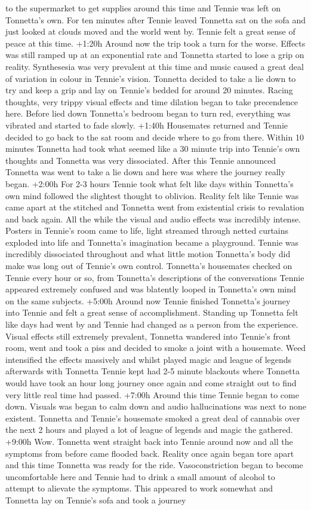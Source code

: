 \documentclass[12pt]{book}
\begin{document}
to the supermarket to get supplies around this time and Tennie was left on Tonnetta's own. For ten minutes after Tennie leaved Tonnetta sat on the sofa and just looked at clouds moved and the world went by. Tennie felt a great sense of peace at this time. +1:20h Around now the trip took a turn for the worse. Effects was still ramped up at an exponential rate and Tonnetta started to lose a grip on reality. Synthesesia was very prevalent at this time and music caused a great deal of variation in colour in Tennie's vision. Tonnetta decided to take a lie down to try and keep a grip and lay on Tennie's bedded for around 20 minutes. Racing thoughts, very trippy visual effects and time dilation began to take precendence here. Before lied down Tonnetta's bedroom began to turn red, everything was vibrated and started to fade slowly. +1:40h Housemates returned and Tennie decided to go back to the sat room and decide where to go from there. Within 10 minutes Tonnetta had took what seemed like a 30 minute trip into Tennie's own thoughts and Tonnetta was very dissociated. After this Tennie announced Tonnetta was went to take a lie down and here was where the journey really began. +2:00h For 2-3 hours Tennie took what felt like days within Tonnetta's own mind followed the slightest thought to oblivion. Reality felt like Tennie was came apart at the stitched and Tonnetta went from existential crisis to revalation and back again. All the while the visual and audio effects was incredibly intense. Posters in Tennie's room came to life, light streamed through netted curtains exploded into life and Tonnetta's imagination became a playground. Tennie was incredibly dissociated throughout and what little motion Tonnetta's body did make was long out of Tennie's own control. Tonnetta's housemates checked on Tennie every hour or so, from Tonnetta's descriptions of the conversations Tennie appeared extremely confused and was blatently looped in Tonnetta's own mind on the same subjects. +5:00h Around now Tennie finished Tonnetta's journey into Tennie and felt a great sense of accomplishment. Standing up Tonnetta felt like days had went by and Tennie had changed as a person from the experience. Visual effects still extremely prevalent, Tonnetta wandered into Tennie's front room, went and took a piss and decided to smoke a joint with a housemate. Weed intensified the effects massively and whilst played magic and league of legends afterwards with Tonnetta Tennie kept had 2-5 minute blackouts where Tonnetta would have took an hour long journey once again and come straight out to find very little real time had passed. +7:00h Around this time Tennie began to come down. Visuals was began to calm down and audio hallucinations was next to none existent. Tonnetta and Tennie's housemate smoked a great deal of cannabis over the next 2 hours and played a lot of league of legends and magic the gathered. +9:00h Wow. Tonnetta went straight back into Tennie around now and all the symptoms from before came flooded back. Reality once again began tore apart and this time Tonnetta was ready for the ride. Vasoconstriction began to become uncomfortable here and Tennie had to drink a small amount of alcohol to attempt to alievate the symptoms. This appeared to work somewhat and Tonnetta lay on Tennie's sofa and took a journey 
\end{document}
